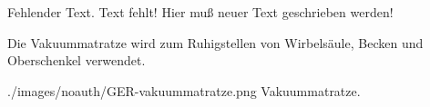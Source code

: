 {
\begin{anfxerror}[author=GABS]{Fehlender Text.}
  Text fehlt! Hier muß neuer Text geschrieben werden!
\end{anfxerror}
Die Vakuummatratze wird zum Ruhigstellen von Wirbelsäule, Becken und
Oberschenkel verwendet. }{

}
{./images/noauth/GER-vakuummatratze.png}
{Vakuummatratze.}
{}





\nocite{RueckerBildatlas1}